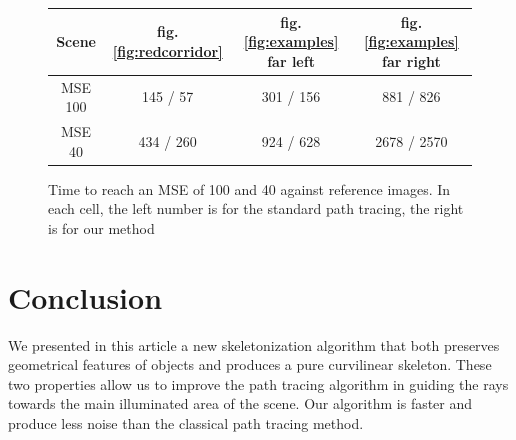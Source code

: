 \begin{figure}[tb]
\centering
\begin{tabular}{|c|c|c|c|}
\hline
Scene & fig.\ref{fig:redcorridor} & fig.\ref{fig:examples} far left & fig.\ref{fig:examples} far right \\
\hline
MSE 100& 145 / 57 & 301 / 156 & 881 / 826 \\
\hline
MSE 40& 434 / 260 & 924 / 628 & 2678 / 2570 \\
\hline
\end{tabular}
\caption{Time to reach an MSE of 100 and 40 against reference images. In each cell, the left number is for the standard path tracing, the right is for our method}
\label{tab:timing}
\end{figure}

\section{Conclusion}
We presented in this article a new skeletonization algorithm that both preserves geometrical features of objects and produces a pure curvilinear skeleton. These two properties allow us to improve the path tracing algorithm in guiding the rays towards the main illuminated area of the scene. Our algorithm is faster and produce less noise than the classical path tracing method.